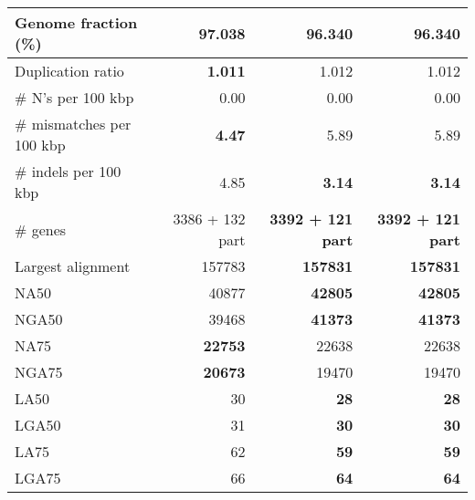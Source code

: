 \documentclass[12pt,a4paper]{article}
\begin{document}
\begin{table}[ht]
\begin{center}
\begin{tabular}{|l*{3}{|r}|}
Genome fraction (\%) & {\bf 97.038} & 96.340 & 96.340 \\ \hline
Duplication ratio & {\bf 1.011} & 1.012 & 1.012 \\ \hline
\# N's per 100 kbp & 0.00 & 0.00 & 0.00 \\ \hline
\# mismatches per 100 kbp & {\bf 4.47} & 5.89 & 5.89 \\ \hline
\# indels per 100 kbp & 4.85 & {\bf 3.14} & {\bf 3.14} \\ \hline
\# genes & 3386 + 132 part & {\bf 3392 + 121 part} & {\bf 3392 + 121 part} \\ \hline
Largest alignment & 157783 & {\bf 157831} & {\bf 157831} \\ \hline
NA50 & 40877 & {\bf 42805} & {\bf 42805} \\ \hline
NGA50 & 39468 & {\bf 41373} & {\bf 41373} \\ \hline
NA75 & {\bf 22753} & 22638 & 22638 \\ \hline
NGA75 & {\bf 20673} & 19470 & 19470 \\ \hline
LA50 & 30 & {\bf 28} & {\bf 28} \\ \hline
LGA50 & 31 & {\bf 30} & {\bf 30} \\ \hline
LA75 & 62 & {\bf 59} & {\bf 59} \\ \hline
LGA75 & 66 & {\bf 64} & {\bf 64} \\ \hline
\end{tabular}
\end{center}
\end{table}
\end{document}

